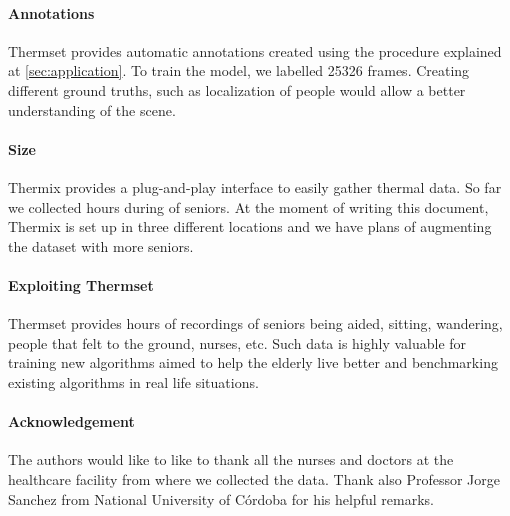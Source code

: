 \documentclass[oneside, twocolumn]{article}
\begin{document}
\paragraph{Annotations}
Thermset provides automatic annotations created using the procedure explained at \autoref{sec:application}.
To train the model, we labelled 25326 frames. Creating different ground truths, such as localization of
people would allow a better understanding of the scene.
\paragraph{Size}
Thermix provides a plug-and-play interface to easily gather thermal data. So far we collected \TotalHoursOfRecording{}
hours during \TotalNumberOfDays{} of \NumberOfPeople{} seniors. At the moment of writing this document, Thermix is set up in
three different locations and we have plans of augmenting the dataset with more seniors.

\paragraph{Exploiting Thermset}
Thermset provides hours of recordings of seniors being aided, sitting, wandering, people that felt to the
ground, nurses, etc. Such data is highly valuable for training new algorithms aimed to help the elderly live
better and benchmarking existing algorithms in real life situations.
\paragraph{Acknowledgement}
The authors would like to like to thank all the nurses and doctors at the healthcare facility from where we
collected the data. Thank also Professor Jorge Sanchez from National University of C\'ordoba for his helpful remarks.

\end{document}
